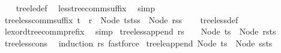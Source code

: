 \begin{isabellebody}
%
\isadelimproof
\ \ %
\endisadelimproof
%
\isatagproof
{}\isamarkupfalse%
\ tree{\isacharunderscore}{\kern0pt}le{\isacharunderscore}{\kern0pt}def\ \isamarkupfalse%
\ less{\isacharunderscore}{\kern0pt}tree{\isacharunderscore}{\kern0pt}comm{\isacharunderscore}{\kern0pt}suffix\ \isamarkupfalse%
\ simp%
\endisatagproof
{\isafoldproof}%
%
\isadelimproof
\isanewline
%
\endisadelimproof
\isanewline
{}\isamarkupfalse%
\ tree{\isacharunderscore}{\kern0pt}less{\isacharunderscore}{\kern0pt}comm{\isacharunderscore}{\kern0pt}suffix{}{\isacharcolon}{\kern0pt}\ {\isachardoublequoteopen}t\ {\isacharless}{\kern0pt}\ r\ {\isasymLongrightarrow}\ Node\ {\isacharparenleft}{\kern0pt}ts{\isacharat}{\kern0pt}t{\isacharhash}{\kern0pt}ss{\isacharparenright}{\kern0pt}\ {\isacharless}{\kern0pt}\ Node\ {\isacharparenleft}{\kern0pt}r{\isacharhash}{\kern0pt}ss{\isacharparenright}{\kern0pt}{\isachardoublequoteclose}\isanewline
%
\isadelimproof
\ \ %
\endisadelimproof
%
\isatagproof
{}\isamarkupfalse%
\ tree{\isacharunderscore}{\kern0pt}less{\isacharunderscore}{\kern0pt}def\ \isamarkupfalse%
\ lexord{\isacharunderscore}{\kern0pt}tree{\isacharunderscore}{\kern0pt}comm{\isacharunderscore}{\kern0pt}prefix\ \isamarkupfalse%
\ simp%
\endisatagproof
{\isafoldproof}%
%
\isadelimproof
\isanewline
%
\endisadelimproof
\isanewline
{}\isamarkupfalse%
\ tree{\isacharunderscore}{\kern0pt}less{\isacharunderscore}{\kern0pt}append{\isacharcolon}{\kern0pt}\ {\isachardoublequoteopen}rs\ {\isasymnoteq}\ {\isacharbrackleft}{\kern0pt}{\isacharbrackright}{\kern0pt}\ {\isasymLongrightarrow}\ Node\ ts\ {\isacharless}{\kern0pt}\ Node\ {\isacharparenleft}{\kern0pt}rs{\isacharat}{\kern0pt}ts{\isacharparenright}{\kern0pt}{\isachardoublequoteclose}\isanewline
%
\isadelimproof
\ \ %
\endisadelimproof
%
\isatagproof
{}\isamarkupfalse%
\ tree{\isacharunderscore}{\kern0pt}less{\isacharunderscore}{\kern0pt}cons{\isacharprime}{\kern0pt}\ \isamarkupfalse%
\ {\isacharparenleft}{\kern0pt}induction\ rs{\isacharparenright}{\kern0pt}\ fastforce{\isacharplus}{\kern0pt}%
\endisatagproof
{\isafoldproof}%
%
\isadelimproof
\isanewline
%
\endisadelimproof
\isanewline
{}\isamarkupfalse%
\ tree{\isacharunderscore}{\kern0pt}le{\isacharunderscore}{\kern0pt}append{\isacharcolon}{\kern0pt}\ {\isachardoublequoteopen}Node\ ts\ {\isasymle}\ Node\ {\isacharparenleft}{\kern0pt}ss{\isacharat}{\kern0pt}ts{\isacharparenright}{\kern0pt}{\isachardoublequoteclose}\isanewline

\end{isabellebody}
